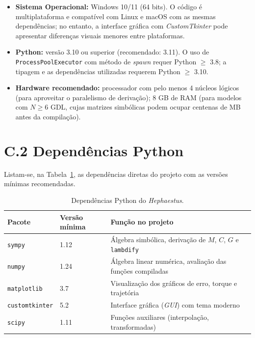 \begin{itemize}
    \item \textbf{Sistema Operacional:} Windows 10/11 (64 bits). O código é multiplataforma e compatível com Linux e macOS com as mesmas dependências; no entanto, a interface gráfica com \textit{CustomTkinter} pode apresentar diferenças visuais menores entre plataformas.
    \item \textbf{Python:} versão 3.10 ou superior (recomendado: 3.11). O uso de \texttt{ProcessPoolExecutor} com método de \textit{spawn} requer Python $\geq$ 3.8; a tipagem e as dependências utilizadas requerem Python $\geq$ 3.10.
    \item \textbf{Hardware recomendado:} processador com pelo menos 4 núcleos lógicos (para aproveitar o paralelismo de derivação); 8 GB de RAM (para modelos com $N \geq 6$ GDL, cujas matrizes simbólicas podem ocupar centenas de MB antes da compilação).
\end{itemize}

\section*{C.2 Dependências Python}

Listam-se, na Tabela~\ref{tab:deps}, as dependências diretas do projeto com as versões mínimas recomendadas.

\begin{table}[h!]
\centering
\caption{Dependências Python do \textit{Hephaestus}.}
\label{tab:deps}
\begin{tabular}{l l p{7cm}}
\hline
\textbf{Pacote} & \textbf{Versão mínima} & \textbf{Função no projeto} \\
\hline
\texttt{sympy}         & 1.12   & Álgebra simbólica, derivação de $M$, $C$, $G$ e \texttt{lambdify} \\
\texttt{numpy}         & 1.24   & Álgebra linear numérica, avaliação das funções compiladas \\
\texttt{matplotlib}    & 3.7    & Visualização dos gráficos de erro, torque e trajetória \\
\texttt{customtkinter} & 5.2    & Interface gráfica (\textit{GUI}) com tema moderno \\
\texttt{scipy}         & 1.11   & Funções auxiliares (interpolação, transformadas) \\
\hline
\end{tabular}
\end{table}

